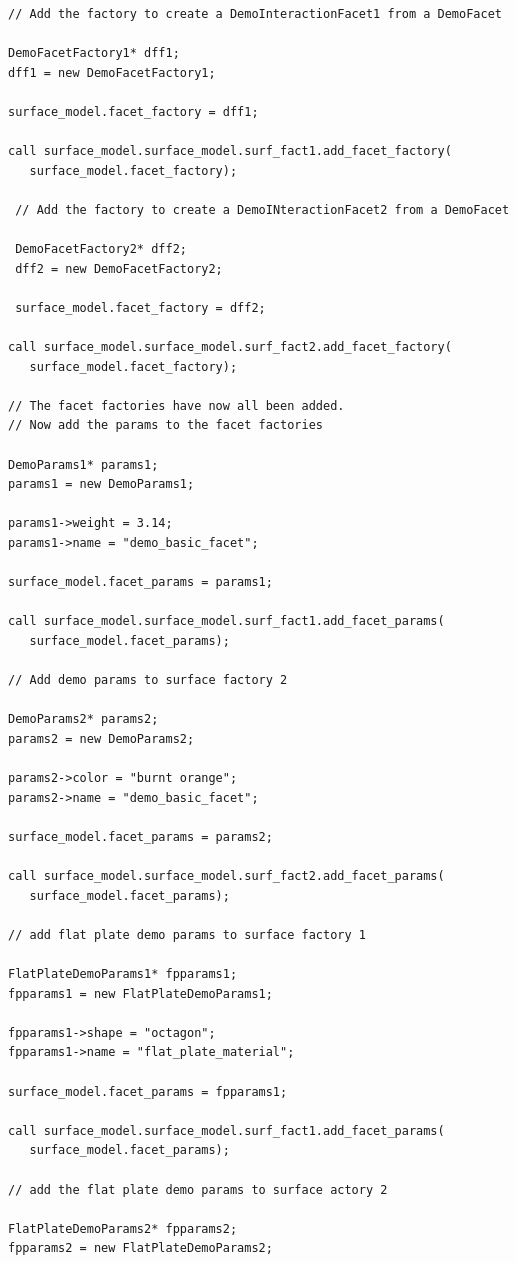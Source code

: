 \begin{description}
\begin{verbatim}
// Add the factory to create a DemoInteractionFacet1 from a DemoFacet

DemoFacetFactory1* dff1;
dff1 = new DemoFacetFactory1;

surface_model.facet_factory = dff1;
 
call surface_model.surface_model.surf_fact1.add_facet_factory(
   surface_model.facet_factory);
 
 // Add the factory to create a DemoINteractionFacet2 from a DemoFacet
 
 DemoFacetFactory2* dff2;
 dff2 = new DemoFacetFactory2;
 
 surface_model.facet_factory = dff2;
 
call surface_model.surface_model.surf_fact2.add_facet_factory(
   surface_model.facet_factory);

// The facet factories have now all been added.
// Now add the params to the facet factories

DemoParams1* params1;
params1 = new DemoParams1;

params1->weight = 3.14;
params1->name = "demo_basic_facet";

surface_model.facet_params = params1;

call surface_model.surface_model.surf_fact1.add_facet_params(
   surface_model.facet_params);

// Add demo params to surface factory 2

DemoParams2* params2;
params2 = new DemoParams2;

params2->color = "burnt orange";
params2->name = "demo_basic_facet";

surface_model.facet_params = params2;

call surface_model.surface_model.surf_fact2.add_facet_params(
   surface_model.facet_params);

// add flat plate demo params to surface factory 1

FlatPlateDemoParams1* fpparams1;
fpparams1 = new FlatPlateDemoParams1;

fpparams1->shape = "octagon";
fpparams1->name = "flat_plate_material";

surface_model.facet_params = fpparams1;

call surface_model.surface_model.surf_fact1.add_facet_params(
   surface_model.facet_params);

// add the flat plate demo params to surface actory 2

FlatPlateDemoParams2* fpparams2;
fpparams2 = new FlatPlateDemoParams2;


\end{verbatim}
\end{description}
